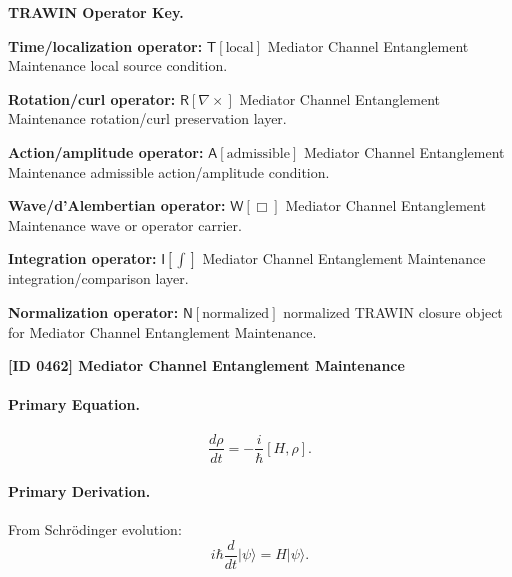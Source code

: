 \par\vspace{0.45\baselineskip}
\noindent\begin{minipage}[t]{\linewidth}
\begingroup
\small
\raggedright
\textbf{TRAWIN Operator Key.}\par
\noindent\textbf{Time/localization operator:} $\mathsf{T}\!\left[\mathrm{local}\right]$ Mediator Channel Entanglement Maintenance local source condition.\par
\noindent\textbf{Rotation/curl operator:} $\mathsf{R}\!\left[\nabla\times\right]$ Mediator Channel Entanglement Maintenance rotation/curl preservation layer.\par
\noindent\textbf{Action/amplitude operator:} $\mathsf{A}\!\left[\mathrm{admissible}\right]$ Mediator Channel Entanglement Maintenance admissible action/amplitude condition.\par
\noindent\textbf{Wave/d'Alembertian operator:} $\mathsf{W}\!\left[\Box\right]$ Mediator Channel Entanglement Maintenance wave or operator carrier.\par
\noindent\textbf{Integration operator:} $\mathsf{I}\!\left[\int\right]$ Mediator Channel Entanglement Maintenance integration/comparison layer.\par
\noindent\textbf{Normalization operator:} $\mathsf{N}\!\left[\mathrm{normalized}\right]$ normalized TRAWIN closure object for Mediator Channel Entanglement Maintenance.\par
\endgroup
\end{minipage}

\clearpage
\noindent\textbf{[ID 0462] Mediator Channel Entanglement Maintenance}\par
\vspace{0.35em}
\paragraph{Primary Equation.}
\begin{equation}
\frac{d\rho}{dt} = -\frac{i}{\hbar}[H,\rho].
\end{equation}

\paragraph{Primary Derivation.}
From Schrödinger evolution:
\begin{equation}
i\hbar \frac{d}{dt}|\psi\rangle = H|\psi\rangle.
\end{equation}

